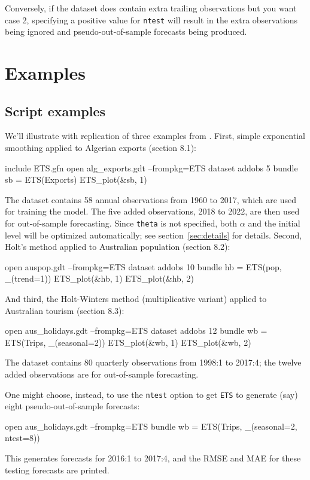 \documentclass{article}
\begin{document}
Conversely, if the dataset does contain extra trailing observations
but you want case 2, specifying a positive value for \texttt{ntest}
will result in the extra observations being ignored and
pseudo-out-of-sample forecasts being produced.

\section{Examples}
\label{sec:examples}

\subsection{Script examples}

We'll illustrate with replication of three examples from
\citet{hyndman2021}. First, simple exponential smoothing applied to
Algerian exports (section 8.1):
\begin{nscode}
include ETS.gfn
open alg_exports.gdt --frompkg=ETS
dataset addobs 5
bundle sb = ETS(Exports)
ETS_plot(&sb, 1)
\end{nscode}

The  dataset contains 58 annual observations from
1960 to 2017, which are used for training the model. The five added
observations, 2018 to 2022, are then used for out-of-sample
forecasting. Since \texttt{theta} is not specified, both $\alpha$ and
the initial level will be optimized automatically; see
section~\ref{sec:details} for details. Second, Holt's method applied to
Australian population (section 8.2):
\begin{nscode}
open auspop.gdt --frompkg=ETS
dataset addobs 10
bundle hb = ETS(pop, _(trend=1))
ETS_plot(&hb, 1)
ETS_plot(&hb, 2)
\end{nscode}
And third, the Holt-Winters method (multiplicative variant) applied to
Australian tourism (section 8.3):
\begin{nscode}
open aus_holidays.gdt --frompkg=ETS
dataset addobs 12
bundle wb = ETS(Trips, _(seasonal=2))
ETS_plot(&wb, 1)
ETS_plot(&wb, 2)
\end{nscode}
The  dataset contains 80 quarterly observations
from 1998:1 to 2017:4; the twelve added observations are for
out-of-sample forecasting.

One might choose, instead, to use the \texttt{ntest} option to get
\texttt{ETS} to generate (say) eight pseudo-out-of-sample forecasts:
\begin{nscode}
open aus_holidays.gdt --frompkg=ETS
bundle wb = ETS(Trips, _(seasonal=2, ntest=8))
\end{nscode}
This generates forecasts for 2016:1 to 2017:4, and the RMSE and MAE for
these testing forecasts are printed.
\end{document}
